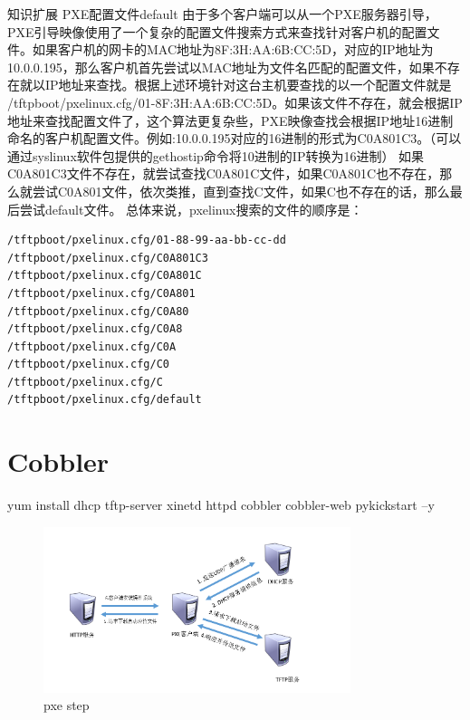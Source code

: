 知识扩展
PXE配置文件default
由于多个客户端可以从一个PXE服务器引导，PXE引导映像使用了一个复杂的配置文件搜索方式来查找针对客户机的配置文件。如果客户机的网卡的MAC地址为8F:3H:AA:6B:CC:5D，对应的IP地址为10.0.0.195，那么客户机首先尝试以MAC地址为文件名匹配的配置文件，如果不存在就以IP地址来查找。根据上述环境针对这台主机要查找的以一个配置文件就是 /tftpboot/pxelinux.cfg/01-8F:3H:AA:6B:CC:5D。如果该文件不存在，就会根据IP地址来查找配置文件了，这个算法更复杂些，PXE映像查找会根据IP地址16进制命名的客户机配置文件。例如:10.0.0.195对应的16进制的形式为C0A801C3。（可以通过syslinux软件包提供的gethostip命令将10进制的IP转换为16进制）
如果C0A801C3文件不存在，就尝试查找C0A801C文件，如果C0A801C也不存在，那么就尝试C0A801文件，依次类推，直到查找C文件，如果C也不存在的话，那么最后尝试default文件。
总体来说，pxelinux搜索的文件的顺序是：

\begin{lstlisting}
/tftpboot/pxelinux.cfg/01-88-99-aa-bb-cc-dd
/tftpboot/pxelinux.cfg/C0A801C3
/tftpboot/pxelinux.cfg/C0A801C
/tftpboot/pxelinux.cfg/C0A801
/tftpboot/pxelinux.cfg/C0A80
/tftpboot/pxelinux.cfg/C0A8
/tftpboot/pxelinux.cfg/C0A
/tftpboot/pxelinux.cfg/C0
/tftpboot/pxelinux.cfg/C
/tftpboot/pxelinux.cfg/default
\end{lstlisting}


\section{Cobbler}

yum install dhcp tftp-server xinetd httpd cobbler cobbler-web pykickstart –y

\begin{figure}[!ht]
    \centering
     \caption{\label{Fig:pxe-step} pxe step}
    \includegraphics[width=0.8\textwidth]{cobble/images/pxe-step.png}
\end{figure}

